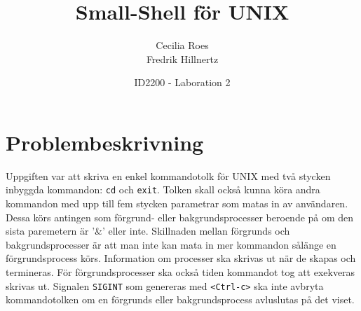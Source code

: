 \documentclass[a4paper]{article}
\title{Small-Shell för UNIX}
\date{ID2200 - Laboration 2}
\author{Cecilia Roes \\ Fredrik Hillnertz}
\begin{document}

\maketitle

\section*{Problembeskrivning}
Uppgiften var att skriva en enkel kommandotolk för UNIX med två stycken inbyggda kommandon: \texttt{cd} och \texttt{exit}. Tolken skall också kunna köra andra kommandon med upp till fem stycken parametrar som matas in av användaren. Dessa körs antingen som förgrund- eller bakgrundsprocesser beroende på om den sista paremetern är '\&' eller inte. Skillnaden mellan förgrunds och bakgrundsprocesser är att man inte kan mata in mer kommandon sålänge en förgrundsprocess körs. Information om processer ska skrivas ut när de skapas och termineras. För förgrundsprocesser ska också tiden kommandot tog att exekveras skrivas ut. Signalen \texttt{SIGINT} som genereras med \texttt{<Ctrl-c>} ska inte avbryta kommandotolken om en förgrunds eller bakgrundsprocess avluslutas på det viset. 
\end{document}

